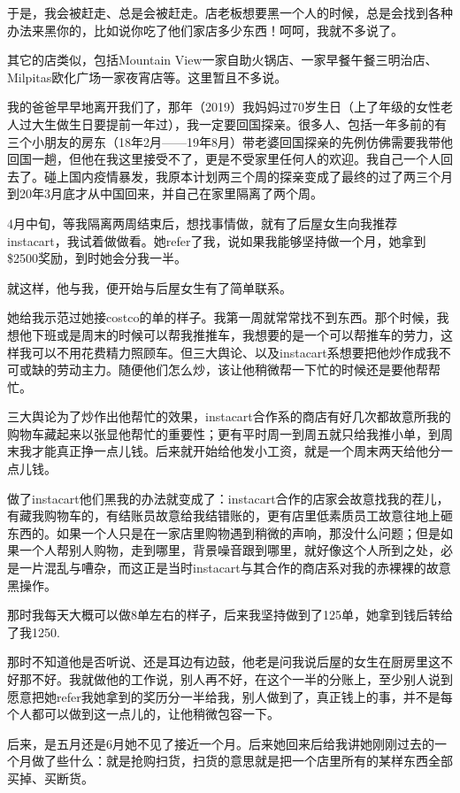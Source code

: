 \documentclass[9pt, b5paper]{article}
\begin{document}
于是，我会被赶走、总是会被赶走。店老板想要黑一个人的时候，总是会找到各种办法来黑你的，比如说你吃了他们家店多少东西！呵呵，我就不多说了。

其它的店类似，包括Mountain View一家自助火锅店、一家早餐午餐三明治店、Milpitas欧化广场一家夜宵店等。这里暂且不多说。

我的爸爸早早地离开我们了，那年（2019）我妈妈过70岁生日（上了年级的女性老人过大生做生日要提前一年过），我一定要回国探亲。很多人、包括一年多前的有三个小朋友的房东（18年2月——19年8月）带老婆回国探亲的先例仿佛需要我带他回国一趟，但他在我这里接受不了，更是不受家里任何人的欢迎。我自己一个人回去了。碰上国内疫情暴发，我原本计划两三个周的探亲变成了最终的过了两三个月到20年3月底才从中国回来，并自己在家里隔离了两个周。 

4月中旬，等我隔离两周结束后，想找事情做，就有了后屋女生向我推荐instacart，我试着做做看。她refer了我，说如果我能够坚持做一个月，她拿到\$2500奖励，到时她会分我一半。 

就这样，他与我，便开始与后屋女生有了简单联系。

她给我示范过她接costco的单的样子。我第一周就常常找不到东西。那个时候，我想他下班或是周末的时候可以帮我推推车，我想要的是一个可以帮推车的劳力，这样我可以不用花费精力照顾车。但三大舆论、以及instacart系想要把他炒作成我不可或缺的劳动主力。随便他们怎么炒，该让他稍微帮一下忙的时候还是要他帮帮忙。

三大舆论为了炒作出他帮忙的效果，instacart合作系的商店有好几次都故意所我的购物车藏起来以张显他帮忙的重要性；更有平时周一到周五就只给我推小单，到周末我才能真正挣一点儿钱。后来就开始给他发小工资，就是一个周末两天给他分一点儿钱。

做了instacart他们黑我的办法就变成了：instacart合作的店家会故意找我的茬儿，有藏我购物车的，有结账员故意给我结错账的，更有店里低素质员工故意往地上砸东西的。如果一个人只是在一家店里购物遇到稍微的声响，那没什么问题；但是如果一个人帮别人购物，走到哪里，背景噪音跟到哪里，就好像这个人所到之处，必是一片混乱与嘈杂，而这正是当时instacart与其合作的商店系对我的赤裸裸的故意黑操作。

那时我每天大概可以做8单左右的样子，后来我坚持做到了125单，她拿到钱后转给了我1250.

那时不知道他是否听说、还是耳边有边鼓，他老是问我说后屋的女生在厨房里这不好那不好。我就做他的工作说，别人再不好，在这个一半的分账上，至少别人说到愿意把她refer我她拿到的奖历分一半给我，别人做到了，真正钱上的事，并不是每个人都可以做到这一点儿的，让他稍微包容一下。 

后来，是五月还是6月她不见了接近一个月。后来她回来后给我讲她刚刚过去的一个月做了些什么：就是抢购扫货，扫货的意思就是把一个店里所有的某样东西全部买掉、买断货。
\end{document}
